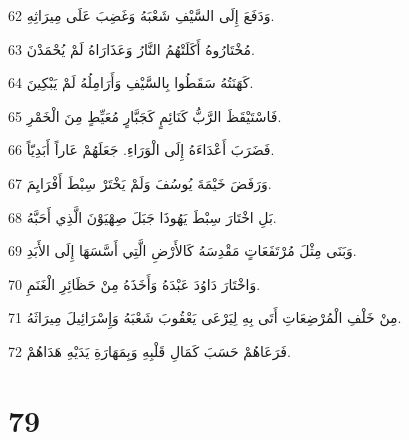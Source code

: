 \par 62 وَدَفَعَ إِلَى السَّيْفِ شَعْبَهُ وَغَضِبَ عَلَى مِيرَاثِهِ.
\par 63 مُخْتَارُوهُ أَكَلَتْهُمُ النَّارُ وَعَذَارَاهُ لَمْ يُحْمَدْنَ.
\par 64 كَهَنَتُهُ سَقَطُوا بِالسَّيْفِ وَأَرَامِلُهُ لَمْ يَبْكِينَ.
\par 65 فَاسْتَيْقَظَ الرَّبُّ كَنَائِمٍ كَجَبَّارٍ مُعَيِّطٍ مِنَ الْخَمْرِ.
\par 66 فَضَرَبَ أَعْدَاءَهُ إِلَى الْوَرَاءِ. جَعَلَهُمْ عَاراً أَبَدِيّاً.
\par 67 وَرَفَضَ خَيْمَةَ يُوسُفَ وَلَمْ يَخْتَرْ سِبْطَ أَفْرَايِمَ.
\par 68 بَلِ اخْتَارَ سِبْطَ يَهُوذَا جَبَلَ صِهْيَوْنَ الَّذِي أَحَبَّهُ.
\par 69 وَبَنَى مِثْلَ مُرْتَفَعَاتٍ مَقْدِسَهُ كَالأَرْضِ الَّتِي أَسَّسَهَا إِلَى الأَبَدِ.
\par 70 وَاخْتَارَ دَاوُدَ عَبْدَهُ وَأَخَذَهُ مِنْ حَظَائِرِ الْغَنَمِ.
\par 71 مِنْ خَلْفِ الْمُرْضِعَاتِ أَتَى بِهِ لِيَرْعَى يَعْقُوبَ شَعْبَهُ وَإِسْرَائِيلَ مِيرَاثَهُ.
\par 72 فَرَعَاهُمْ حَسَبَ كَمَالِ قَلْبِهِ وَبِمَهَارَةِ يَدَيْهِ هَدَاهُمْ.

\chapter{79}

